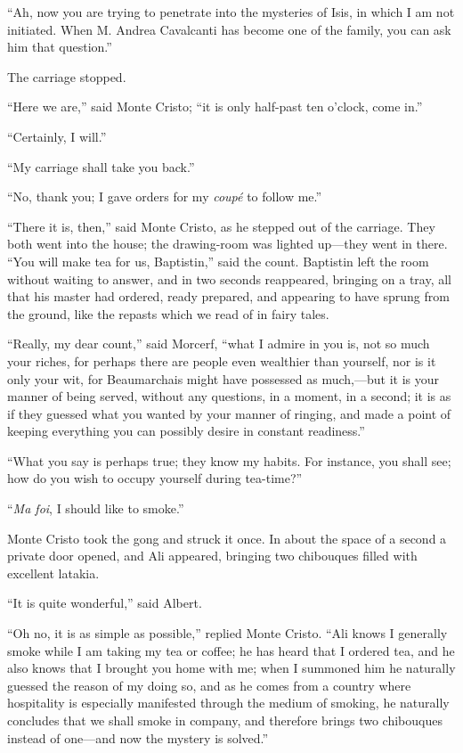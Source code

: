 “Ah, now you are trying to penetrate into the mysteries of Isis, in
which I am not initiated. When M. Andrea Cavalcanti has become one of
the family, you can ask him that question.”

The carriage stopped.

“Here we are,” said Monte Cristo; “it is only half-past ten o’clock,
come in.”

“Certainly, I will.”

“My carriage shall take you back.”

“No, thank you; I gave orders for my \textit{coupé} to follow me.”

“There it is, then,” said Monte Cristo, as he stepped out of the
carriage. They both went into the house; the drawing-room was lighted
up—they went in there. “You will make tea for us, Baptistin,” said the
count. Baptistin left the room without waiting to answer, and in two
seconds reappeared, bringing on a tray, all that his master had
ordered, ready prepared, and appearing to have sprung from the ground,
like the repasts which we read of in fairy tales.

“Really, my dear count,” said Morcerf, “what I admire in you is, not so
much your riches, for perhaps there are people even wealthier than
yourself, nor is it only your wit, for Beaumarchais might have
possessed as much,—but it is your manner of being served, without any
questions, in a moment, in a second; it is as if they guessed what you
wanted by your manner of ringing, and made a point of keeping
everything you can possibly desire in constant readiness.”

“What you say is perhaps true; they know my habits. For instance, you
shall see; how do you wish to occupy yourself during tea-time?”

“\textit{Ma foi}, I should like to smoke.”

Monte Cristo took the gong and struck it once. In about the space of a
second a private door opened, and Ali appeared, bringing two chibouques
filled with excellent latakia.

“It is quite wonderful,” said Albert.

“Oh no, it is as simple as possible,” replied Monte Cristo. “Ali knows
I generally smoke while I am taking my tea or coffee; he has heard that
I ordered tea, and he also knows that I brought you home with me; when
I summoned him he naturally guessed the reason of my doing so, and as
he comes from a country where hospitality is especially manifested
through the medium of smoking, he naturally concludes that we shall
smoke in company, and therefore brings two chibouques instead of
one—and now the mystery is solved.”

